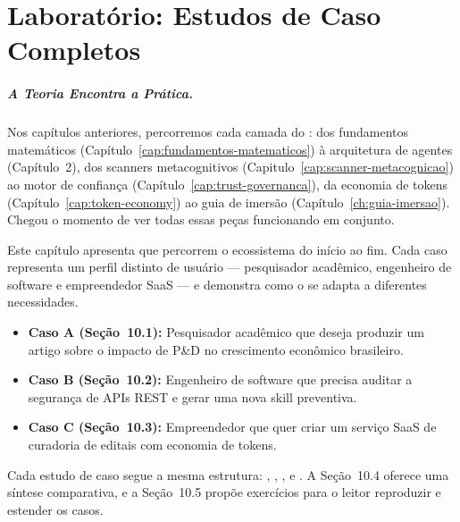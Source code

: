 \chapter{Laboratório: Estudos de Caso Completos}
\label{ch:estudos-caso}

\paragraph{A Teoria Encontra a Prática.} Nos capítulos anteriores,
percorremos cada camada do \opencodeeco{}: dos fundamentos matemáticos
(Capítulo~\ref{cap:fundamentos-matematicos}) à arquitetura de agentes
(Capítulo~2), dos scanners metacognitivos
(Capitulo~\ref{cap:scanner-metacognicao}) ao motor de confiança
(Capítulo~\ref{cap:trust-governanca}), da economia de tokens
(Capítulo~\ref{cap:token-economy}) ao guia de imersão
(Capítulo~\ref{ch:guia-imersao}). Chegou o momento de ver todas essas
peças funcionando em conjunto.

Este capítulo apresenta  que
percorrem o ecossistema do início ao fim. Cada caso representa um perfil
distinto de usuário --- pesquisador acadêmico, engenheiro de software e
empreendedor SaaS --- e demonstra como o \opencodeeco{} se adapta a
diferentes necessidades.

\begin{itemize}
    \item \textbf{Caso A (Seção~10.1):} Pesquisador acadêmico que deseja
          produzir um artigo \qualisA{} sobre o impacto de P\&D no
          crescimento econômico brasileiro.
    \item \textbf{Caso B (Seção~10.2):} Engenheiro de software que precisa
          auditar a segurança de APIs REST e gerar uma nova skill
          preventiva.
    \item \textbf{Caso C (Seção~10.3):} Empreendedor que quer criar um
          serviço SaaS de curadoria de editais com economia de tokens.
\end{itemize}

Cada estudo de caso segue a mesma estrutura: ,
, ,
 e . A
Seção~10.4 oferece uma síntese comparativa, e a Seção~10.5 propõe
exercícios para o leitor reproduzir e estender os casos.

